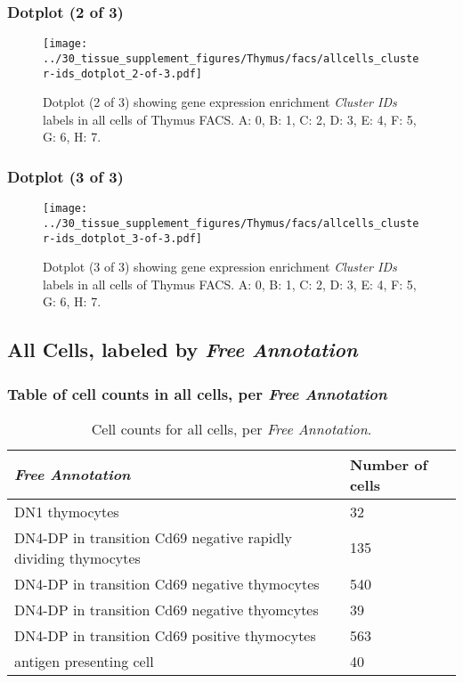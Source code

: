 \clearpage

\subsubsection{Dotplot (2 of 3)}
\begin{figure}[h]
\centering
\texttt{[image: ../30\_tissue\_supplement\_figures/Thymus/facs/allcells\_cluster-ids\_dotplot\_2-of-3.pdf]}

\caption{ Dotplot (2 of 3)  showing gene expression enrichment \emph{Cluster IDs} labels in all cells of Thymus FACS. A: 0, B: 1, C: 2, D: 3, E: 4, F: 5, G: 6, H: 7.}
\end{figure}


\clearpage

\subsubsection{Dotplot (3 of 3)}
\begin{figure}[h]
\centering
\texttt{[image: ../30\_tissue\_supplement\_figures/Thymus/facs/allcells\_cluster-ids\_dotplot\_3-of-3.pdf]}

\caption{ Dotplot (3 of 3)  showing gene expression enrichment \emph{Cluster IDs} labels in all cells of Thymus FACS. A: 0, B: 1, C: 2, D: 3, E: 4, F: 5, G: 6, H: 7.}
\end{figure}


\clearpage

\subsection{All Cells, labeled by \emph{Free Annotation}}
\subsubsection{Table of cell counts in all cells, per \emph{Free Annotation}}\begin{table}[h]
\centering
\label{my-label}
\begin{tabular}{@{}ll@{}}
\toprule

\emph{Free Annotation}& Number of cells \\ \midrule
DN1 thymocytes & 32 \\

DN4-DP in transition Cd69 negative rapidly dividing thymocytes & 135 \\

DN4-DP in transition Cd69 negative thymocytes & 540 \\

DN4-DP in transition Cd69 negative thyomcytes & 39 \\

DN4-DP in transition Cd69 positive thymocytes & 563 \\

antigen presenting cell & 40 \\
\bottomrule
\end{tabular}
\caption{Cell counts for all cells, per \emph{Free Annotation}.}
\end{table}

